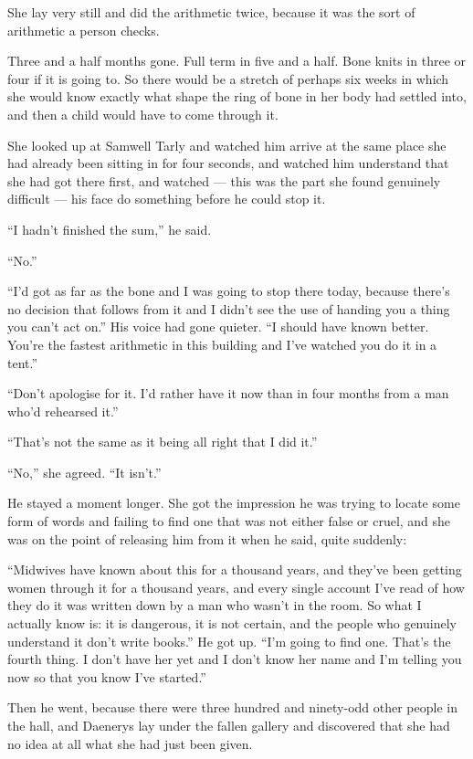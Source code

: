 She lay very still and did the arithmetic twice, because it was the sort of arithmetic a person checks.

Three and a half months gone. Full term in five and a half. Bone knits in three or four if it is going to. So there would be a stretch of perhaps six weeks in which she would know exactly what shape the ring of bone in her body had settled into, and then a child would have to come through it.

She looked up at Samwell Tarly and watched him arrive at the same place she had already been sitting in for four seconds, and watched him understand that she had got there first, and watched — this was the part she found genuinely difficult — his face do something before he could stop it.

“I hadn’t finished the sum,” he said.

“No.”

“I’d got as far as the bone and I was going to stop there today, because there’s no decision that follows from it and I didn’t see the use of handing you a thing you can’t act on.” His voice had gone quieter. “I should have known better. You’re the fastest arithmetic in this building and I’ve watched you do it in a tent.”

“Don’t apologise for it. I’d rather have it now than in four months from a man who’d rehearsed it.”

“That’s not the same as it being all right that I did it.”

“No,” she agreed. “It isn’t.”

He stayed a moment longer. She got the impression he was trying to locate some form of words and failing to find one that was not either false or cruel, and she was on the point of releasing him from it when he said, quite suddenly:

“Midwives have known about this for a thousand years, and they’ve been getting women through it for a thousand years, and every single account I’ve read of how they do it was written down by a man who wasn’t in the room. So what I actually know is: it is dangerous, it is not certain, and the people who genuinely understand it don’t write books.” He got up. “I’m going to find one. That’s the fourth thing. I don’t have her yet and I don’t know her name and I’m telling you now so that you know I’ve started.”

Then he went, because there were three hundred and ninety-odd other people in the hall, and Daenerys lay under the fallen gallery and discovered that she had no idea at all what she had just been given.

